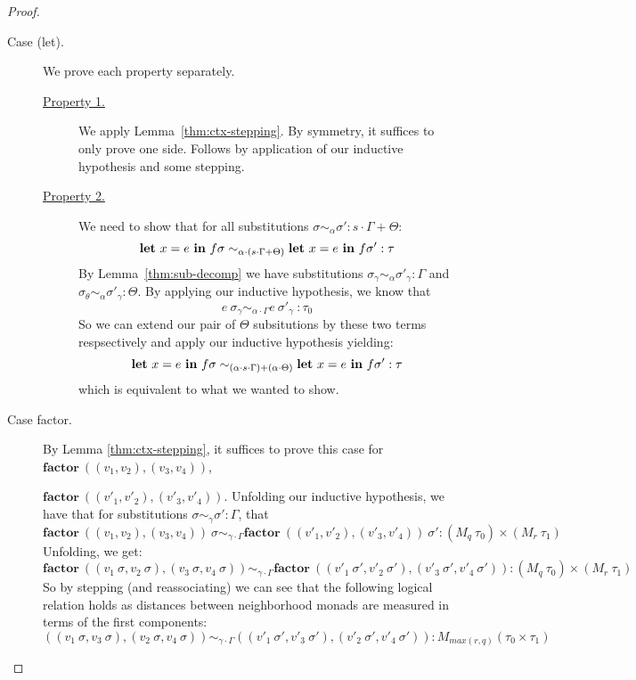 \begin{proof}
\begin{description}
    \item[Case (let).] 
      We prove each property separately.
      \begin{description}
        \item[\underline{Property 1.}]
          We apply Lemma~\ref{thm:ctx-stepping}. By symmetry, it suffices to
          only prove one side. Follows by application of our inductive
          hypothesis and some stepping.
        \item[\underline{Property 2.}]
          We need to show that for all substitutions $\sigma \sim_{\alpha} \sigma' :
          s \cdot \Gamma + \Theta$:
          $$
          \textbf{let} \ x = e \ \textbf{in} \ f \sigma 
            \sim_{\alpha \cdot (s \cdot \Gamma + \Theta)}
          \textbf{let} \ x = e \ \textbf{in} \ f \sigma' :
          \tau
          $$
          By Lemma~\ref{thm:sub-decomp} we have substitutions $\sigma_{\gamma}
          \sim_\alpha \sigma'_{\gamma} : \Gamma$ and $\sigma_{\theta}
          \sim_\alpha \sigma'_{\gamma} : \Theta$. By applying our inductive
          hypothesis, we know that 
          $$
          e~\sigma_{\gamma} \sim_{\alpha \cdot \Gamma}
          e~\sigma'_{\gamma} \ : \tau_0
          $$
          So we can extend our pair of $\Theta$ subsitutions by these two terms
          respsectively and apply our inductive hypothesis yielding:
          $$
          \textbf{let} \ x = e \ \tin \ f \sigma 
            \sim_{(\alpha \cdot s \cdot \Gamma) + (\alpha \cdot \Theta)}
          \textbf{let} \ x = e \ \tin \ f \sigma' :
          \tau
          $$
          which is equivalent to what we wanted to show.

      \end{description}

    \item[Case factor.] 
      By Lemma \ref{thm:ctx-stepping}, it suffices to prove this case for 
      $\mathbf{factor}~((v_1, v_2), (v_3, v_4))$,  

      $\mathbf{factor}~((v'_1, v'_2), (v'_3, v'_4))$. 
      Unfolding our inductive hypothesis, we have that for substitutions
      $\sigma \sim_{\gamma} \sigma' : \Gamma$, that 
      $$
      \textbf{factor} \ ((v_1, v_2), (v_3, v_4))~\sigma 
      \sim_{\gamma \cdot \Gamma} 
      \textbf{factor} \ ((v'_1, v'_2), (v'_3, v'_4))~\sigma' 
      : (M_q~\tau_0) \times (M_r~\tau_1)
      $$
      Unfolding, we get:
      $$
      \textbf{factor} \ ((v_1~\sigma, v_2~\sigma), (v_3~\sigma, v_4~\sigma)) 
      \sim_{\gamma \cdot \Gamma} 
      \textbf{factor} \ ((v'_1~\sigma', v'_2~\sigma'), (v'_3~\sigma', v'_4~\sigma')) 
      : (M_q~\tau_0) \times (M_r~\tau_1)
      $$
      So by stepping (and reassociating) we can see that the following logical
      relation holds as distances between neighborhood monads are measured in
      terms of the first components:
      $$
      ((v_1~\sigma, v_3~\sigma), (v_2~\sigma, v_4~\sigma)) 
      \sim_{\gamma \cdot \Gamma} 
      ((v'_1~\sigma', v'_3~\sigma'), (v'_2~\sigma', v'_4~\sigma')) 
      : M_{max(r,q)}(\tau_0 \times \tau_1)
      $$


\end{description}
\end{proof}

